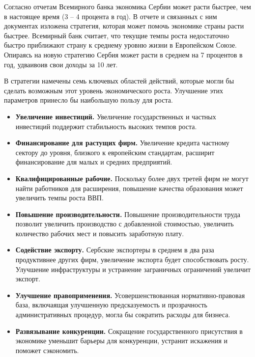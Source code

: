Согласно отчетам Всемирного банка экономика Сербии может расти быстрее, чем в настоящее время (3 -- 4 процента в год).
В отчете \cite{worldbank_cem} и связанных с ним документах \cite{worldbank_investment,worldbank_financing, worldbank_productivity, worldbank_encouraging, worldbank_labormarket, worldbank_barriers, worldbank_aid, worldbank_workforce} изложена стратегия, которая может помочь экономике страны расти быстрее.
Всемирный банк считает, что текущие темпы роста недостаточно быстро приближают страну к среднему уровню жизни в Европейском Союзе.
Опираясь на новую стратегию Сербия может расти в среднем на 7 процентов в год, удваивоив свои доходы за 10 лет.

В стратегии намечены семь ключевых областей действий, которые могли бы сделать возможным этот уровень экономического роста.
Улучшение этих параметров принесло бы наибольшую пользу для роста.
\begin{itemize}
	\item \textbf{Увеличение инвестиций.}
	Увеличение государственных и частных инвестиций поддержит стабильность высоких темпов роста.
	\item \textbf{Финансирование для растущих фирм.}
	Увеличение кредита частному сектору до уровня, близкого к европейским стандартам, расширит финансирование для малых и средних предприятий.
	\item \textbf{Квалифицированные рабочие.}
	Поскольку более двух третей фирм не могут найти работников для расширения, повышение качества образования может увеличить темпы роста ВВП.
	\item \textbf{Повышение производительности.}
	Повышение производительности труда позволит увеличить производство с добавленной стоимостью, увеличить количество рабочих мест и повысить заработную плату.
	\item \textbf{Содействие экспорту.}
	Сербские экспортеры в среднем в два раза продуктивнее других фирм, увеличение экспорта будет способствовать росту.
	Улучшение инфраструктуры и устранение заграничных ограничений увеличит экспорт.
	\item \textbf{Улучшение правоприменения.}
	Усовершенствованная нормативно-правовая база, включаящая улучшенную предсказуемость и прозрачность административных процедур, могла бы сократить расходы для бизнеса.
	\item \textbf{Развязывание конкуренции.}
	Сокращение государственного присутствия в экономике уменьшит барьеры для конкуренции, устранит искажения и поможет сэкономить.
\end{itemize}

